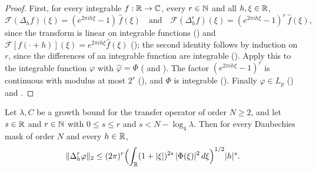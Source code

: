 \begin{proof}
\leanok
{}
First, for every integrable $f : \mathbb{R} \to \mathbb{C}$, every $r \in \mathbb{N}$ and all $h, \xi \in \mathbb{R}$,
\[
  \mathcal F(\Delta_h f)(\xi) = (e^{2\pi i h \xi} - 1) \, \widehat f(\xi)
  \quad\text{and}\quad
  \mathcal F(\Delta_h^r f)(\xi) = (e^{2\pi i h \xi} - 1)^r \, \widehat f(\xi) ,
\]
since the transform is linear on integrable functions () and
$\mathcal F[f(\cdot + h)](\xi) = e^{2\pi i h \xi} \widehat f(\xi)$
(); the second identity follows by induction on $r$, since the
differences of an integrable function are integrable (). Apply this to
the integrable function $\varphi$ with $\widehat\varphi = \Phi$
( and ). The factor
$(e^{2\pi i h \xi} - 1)^r$ is continuous with modulus at most $2^r$
(), and $\Phi$ is integrable
(). Finally $\varphi \in L_p$
() and .
\end{proof}

\begin{lemma}
\label{lem:daub-scaling-difference-l2}
\leanok
{}
Let $\lambda, C$ be a growth bound for the transfer operator of order $N \geq 2$, and let
$s \in \mathbb{R}$ and $r \in \mathbb{N}$ with $0 \leq s \leq r$ and $s < N - \log_4 \lambda$. Then for every
Daubechies mask of order $N$ and every $h \in \mathbb{R}$,
\[
  \|\Delta_h^r \varphi\|_2
  \leq (2\pi)^r \Bigl(\int_{\mathbb{R}} (1 + |\xi|)^{2s} \, |\Phi(\xi)|^2 \, d\xi\Bigr)^{1/2} |h|^s .
\]
\end{lemma}

